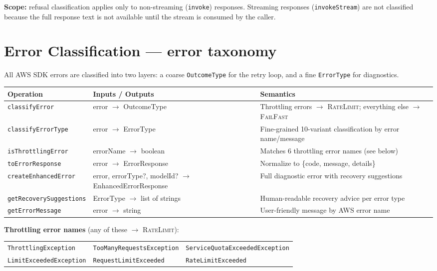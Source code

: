 \documentclass[10pt,letterpaper]{article}
\newcommand{\op}[1]{\textsc{#1}}
\newcommand{\cls}[1]{\texttt{#1}}
\newcommand{\fn}[1]{\texttt{#1}}
\begin{document}
\medskip
\noindent\textbf{Scope:} refusal classification applies only to non-streaming (\fn{invoke}) responses. Streaming responses (\fn{invokeStream}) are not classified because the full response text is not available until the stream is consumed by the caller.

\section*{{\color{utilorange}Error Classification} \normalfont\small--- error taxonomy}

All AWS SDK errors are classified into two layers: a coarse \cls{OutcomeType} for the retry loop, and a fine \cls{ErrorType} for diagnostics.

\smallskip
\begin{tabular}{@{}l l p{6.5cm}@{}}
\toprule
\textbf{Operation} & \textbf{Inputs / Outputs} & \textbf{Semantics} \\
\midrule
\fn{classifyError} & error $\to$ OutcomeType & Throttling errors $\to$ \op{RateLimit}; everything else $\to$ \op{FailFast} \\
\fn{classifyErrorType} & error $\to$ ErrorType & Fine-grained 10-variant classification by error name/message \\
\fn{isThrottlingError} & errorName $\to$ boolean & Matches 6 throttling error names (see below) \\
\fn{toErrorResponse} & error $\to$ ErrorResponse & Normalize to \{code, message, details\} \\
\fn{createEnhancedError} & error, errorType?, modelId? $\to$ EnhancedErrorResponse & Full diagnostic error with recovery suggestions \\
\fn{getRecoverySuggestions} & ErrorType $\to$ list of strings & Human-readable recovery advice per error type \\
\fn{getErrorMessage} & error $\to$ string & User-friendly message by AWS error name \\
\bottomrule
\end{tabular}

\medskip
\noindent\textbf{Throttling error names} (any of these $\to$ \op{RateLimit}):

\smallskip
\begin{tabular}{@{}l l l@{}}
\texttt{ThrottlingException} & \texttt{TooManyRequestsException} & \texttt{ServiceQuotaExceededException} \\
\texttt{LimitExceededException} & \texttt{RequestLimitExceeded} & \texttt{RateLimitExceeded} \\
\end{tabular}
\end{document}
